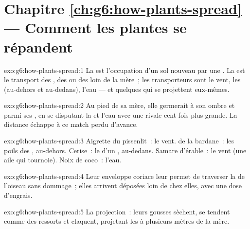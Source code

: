 \section*{Chapitre \ref{ch:g6:how-plants-spread} --- Comment les plantes se répandent}

\begin{solution}{exo:g6:how-plants-spread:1}
La  est l'occupation d'un sol nouveau par une . La
 est le transport des , des  ou des 
loin de la  mère~; les transporteurs sont le vent, les 
(au-dehors et au-dedans), l'eau --- et quelques  qui se
projettent eux-mêmes.
\end{solution}

\begin{solution}{exo:g6:how-plants-spread:2}
Au pied de sa mère, elle germerait à son ombre et parmi ses ,
en se disputant la  et l'eau avec une rivale cent fois plus
grande. La distance échappe à ce match perdu d'avance.
\end{solution}

\begin{solution}{exo:g6:how-plants-spread:3}
Aigrette du pissenlit~: le vent.  de la bardane~: les poils des
, au-dehors. Cerise~: le  d'un ,
au-dedans. Samare d'érable~: le vent (une aile qui tournoie). Noix de
coco~: l'eau.
\end{solution}

\begin{solution}{exo:g6:how-plants-spread:4}
Leur enveloppe coriace leur permet de traverser la  de
l'oiseau sans dommage~; elles arrivent déposées loin de chez elles,
avec une dose d'engrais.
\end{solution}

\begin{solution}{exo:g6:how-plants-spread:5}
La projection~: leurs gousses sèchent, se tendent comme des ressorts
et claquent, projetant les  à plusieurs mètres de la 
mère.
\end{solution}

